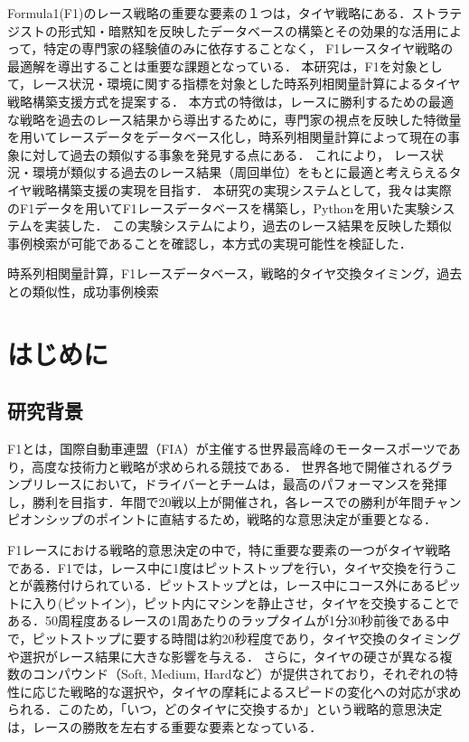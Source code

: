 \documentclass{deimj}
\begin{document}
\pagestyle{empty}

\begin{jabstract}
Formula1(F1)のレース戦略の重要な要素の１つは，タイヤ戦略にある．ストラテジストの形式知・暗黙知を反映したデータベースの構築とその効果的な活用によって，特定の専門家の経験値のみに依存することなく， F1レースタイヤ戦略の最適解を導出することは重要な課題となっている．
本研究は，F1を対象として，レース状況・環境に関する指標を対象とした時系列相関量計算によるタイヤ戦略構築支援方式を提案する．
本方式の特徴は，レースに勝利するための最適な戦略を過去のレース結果から導出するために，専門家の視点を反映した特徴量を用いてレースデータをデータベース化し，時系列相関量計算によって現在の事象に対して過去の類似する事象を発見する点にある．
これにより， レース状況・環境が類似する過去のレース結果（周回単位）をもとに最適と考えらえるタイヤ戦略構築支援の実現を目指す．
本研究の実現システムとして，我々は実際のF1データを用いてF1レースデータベースを構築し，Pythonを用いた実験システムを実装した．
この実験システムにより，過去のレース結果を反映した類似事例検索が可能であることを確認し，本方式の実現可能性を検証した．
\end{jabstract}

\begin{jkeyword}
時系列相関量計算，F1レースデータベース，戦略的タイヤ交換タイミング，過去との類似性，成功事例検索
\end{jkeyword}

\maketitle

\section{はじめに}

\subsection{研究背景}

F1とは，国際自動車連盟（FIA）が主催する世界最高峰のモータースポーツであり，高度な技術力と戦略が求められる競技である．
世界各地で開催されるグランプリレースにおいて，ドライバーとチームは，最高のパフォーマンスを発揮し，勝利を目指す．年間で20戦以上が開催され，各レースでの勝利が年間チャンピオンシップのポイントに直結するため，戦略的な意思決定が重要となる．

F1レースにおける戦略的意思決定の中で，特に重要な要素の一つがタイヤ戦略である．F1では，レース中に1度はピットストップを行い，タイヤ交換を行うことが義務付けられている．ピットストップとは，レース中にコース外にあるピットに入り(ピットイン)，ピット内にマシンを静止させ，タイヤを交換することである．50周程度あるレースの1周あたりのラップタイムが1分30秒前後である中で，ピットストップに要する時間は約20秒程度であり，タイヤ交換のタイミングや選択がレース結果に大きな影響を与える．
さらに，タイヤの硬さが異なる複数のコンパウンド（Soft, Medium, Hardなど）が提供されており，それぞれの特性に応じた戦略的な選択や，タイヤの摩耗によるスピードの変化への対応が求められる．このため，「いつ，どのタイヤに交換するか」という戦略的意思決定は，レースの勝敗を左右する重要な要素となっている．
\end{document}
